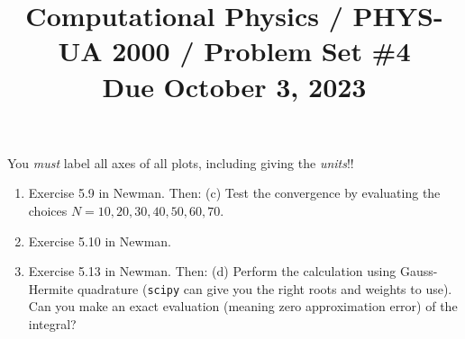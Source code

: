 \documentclass[11pt, preprint]{aastex}
\begin{document}
\title{\bf Computational Physics / PHYS-UA 2000 / Problem Set \#4
\\ Due October 3, 2023 }

You {\it must} label all axes of all plots, including giving the {\it
  units}!!

\begin{enumerate}
  \item Exercise 5.9 in Newman. Then: (c) Test the convergence by
    evaluating the choices $N=10, 20, 30, 40, 50, 60, 70$.
  \item Exercise 5.10 in Newman.
  \item Exercise 5.13 in Newman. Then: (d) Perform the calculation
    using Gauss-Hermite quadrature ({\tt scipy} can give you the right
    roots and weights to use). Can you make an exact evaluation
    (meaning zero approximation error) of the integral?
\end{enumerate}
\end{document}
